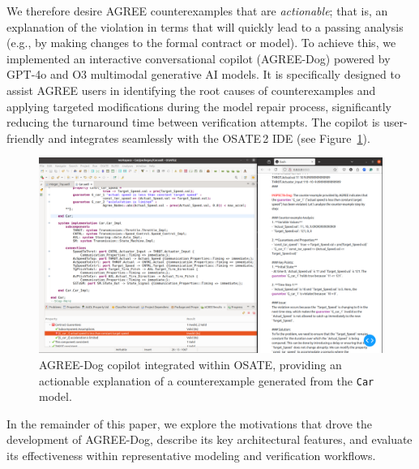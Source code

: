 \label{sec:actionable}
We therefore desire AGREE counterexamples that are \textit{actionable}; that is, an explanation of the violation in terms that will quickly lead to a passing analysis (e.g., by making changes to the formal contract or model).
%
To achieve this, we implemented an interactive conversational copilot (AGREE-Dog) powered by GPT-4o and O3 multimodal generative AI models. It is specifically designed to assist AGREE users in identifying the root causes of counterexamples and applying targeted modifications during the model repair process, significantly reducing the turnaround time between verification attempts. The copilot is user-friendly and integrates seamlessly with the OSATE\,2 IDE (see Figure~\ref{fig:AGREEDOG}).

\begin{figure}[t]
\centering
\includegraphics[height=0.6\textwidth, width=1.0\textwidth]{AGREE-DOG-high-rs.png}
\caption{AGREE-Dog copilot integrated within OSATE, providing an actionable explanation of a counterexample generated from the \texttt{Car} model.}
\label{fig:AGREEDOG}
\end{figure}

In the remainder of this paper, we explore the motivations that drove the development of AGREE-Dog, describe its key architectural features, and evaluate its effectiveness within representative modeling and verification workflows.


